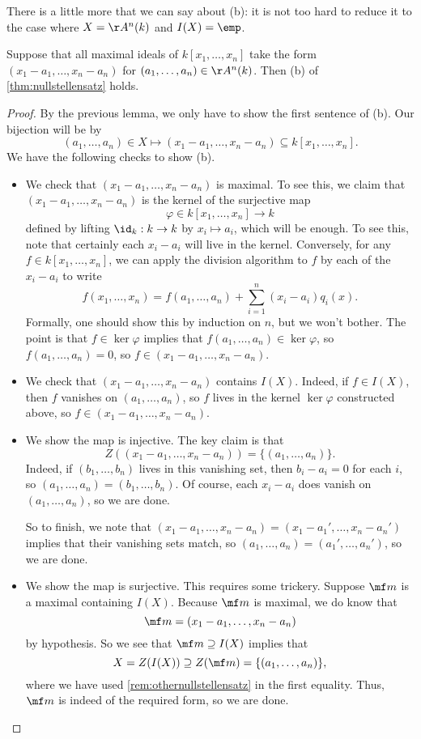 \documentclass[../notes.tex]{subfiles}
\begin{document}
There is a little more that we can say about (b): it is not too hard to reduce it to the case where $X=\AA^n(k)$ and $I(X)=\emp$.
\begin{lemma} \label{lem:nzeasierb}
	Suppose that all maximal ideals of $k[x_1,\ldots,x_n]$ take the form $(x_1-a_1,\ldots,x_n-a_n)$ for $(a_1,\ldots,a_n)\in\AA^n(k)$. Then (b) of \autoref{thm:nullstellensatz} holds.
\end{lemma}
\begin{proof}
	By the previous lemma, we only have to show the first sentence of (b). Our bijection will be by
	\[(a_1,\ldots,a_n)\in X\longmapsto(x_1-a_1,\ldots,x_n-a_n)\subseteq k[x_1,\ldots,x_n].\]
	We have the following checks to show (b).
	\begin{itemize}
		\item We check that $(x_1-a_1,\ldots,x_n-a_n)$ is maximal. To see this, we claim that $(x_1-a_1,\ldots,x_n-a_n)$ is the kernel of the surjective map
		\[\varphi\in k[x_1,\ldots,x_n]\to k\]
		defined by lifting $\id_k:k\to k$ by $x_i\mapsto a_i$, which will be enough. To see this, note that certainly each $x_i-a_i$ will live in the kernel. Conversely, for any $f\in k[x_1,\ldots,x_n]$, we can apply the division algorithm to $f$ by each of the $x_i-a_i$ to write
		\[f(x_1,\ldots,x_n)=f(a_1,\ldots,a_n)+\sum_{i=1}^n(x_i-a_i)q_i(x).\]
		Formally, one should show this by induction on $n$, but we won't bother. The point is that $f\in\ker\varphi$ implies that $f(a_1,\ldots,a_n)\in\ker\varphi$, so $f(a_1,\ldots,a_n)=0$, so $f\in(x_1-a_1,\ldots,x_n-a_n)$.
		\item We check that $(x_1-a_1,\ldots,x_n-a_n)$ contains $I(X)$. Indeed, if $f\in I(X)$, then $f$ vanishes on $(a_1,\ldots,a_n)$, so $f$ lives in the kernel $\ker\varphi$ constructed above, so $f\in(x_1-a_1,\ldots,x_n-a_n)$.
		\item We show the map is injective. The key claim is that
		\[Z((x_1-a_1,\ldots,x_n-a_n))=\{(a_1,\ldots,a_n)\}.\]
		Indeed, if $(b_1,\ldots,b_n)$ lives in this vanishing set, then $b_i-a_i=0$ for each $i$, so $(a_1,\ldots,a_n)=(b_1,\ldots,b_n)$. Of course, each $x_i-a_i$ does vanish on $(a_1,\ldots,a_n)$, so we are done.

		So to finish, we note that $(x_1-a_1,\ldots,x_n-a_n)=(x_1-a_1',\ldots,x_n-a_n')$ implies that their vanishing sets match, so $(a_1,\ldots,a_n)=(a_1',\ldots,a_n')$, so we are done.
		\item We show the map is surjective. This requires some trickery. Suppose $\mf m$ is a maximal containing $I(X)$. Because $\mf m$ is maximal, we do know that
		\[\mf m=(x_1-a_1,\ldots,x_n-a_n)\]
		by hypothesis. So we see that $\mf m\supseteq I(X)$ implies that
		\[X=Z(I(X))\supseteq Z(\mf m)=\{(a_1,\ldots,a_n)\},\]
		where we have used \autoref{rem:othernullstellensatz} in the first equality. Thus, $\mf m$ is indeed of the required form, so we are done.
		\qedhere
	\end{itemize}
\end{proof}
\end{document}
